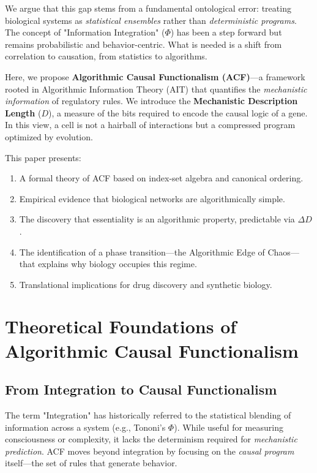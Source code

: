 \documentclass[10pt, twocolumn]{article}
\begin{document}
We argue that this gap stems from a fundamental ontological error: treating biological systems as \textit{statistical ensembles} rather than \textit{deterministic programs}. The concept of "Information Integration" ($\Phi$) has been a step forward but remains probabilistic and behavior-centric. What is needed is a shift from correlation to causation, from statistics to algorithms.

Here, we propose \textbf{Algorithmic Causal Functionalism (ACF)}—a framework rooted in Algorithmic Information Theory (AIT) that quantifies the \textit{mechanistic information} of regulatory rules. We introduce the \textbf{Mechanistic Description Length} ($D$), a measure of the bits required to encode the causal logic of a gene. In this view, a cell is not a hairball of interactions but a compressed program optimized by evolution.

This paper presents:
\begin{enumerate}
    \item A formal theory of ACF based on index-set algebra and canonical ordering.
    \item Empirical evidence that biological networks are algorithmically simple.
    \item The discovery that essentiality is an algorithmic property, predictable via $\Delta D$.
    \item The identification of a phase transition—the Algorithmic Edge of Chaos—that explains why biology occupies this regime.
    \item Translational implications for drug discovery and synthetic biology.
\end{enumerate}

\section{Theoretical Foundations of Algorithmic Causal Functionalism}

\subsection{From Integration to Causal Functionalism}

The term "Integration" has historically referred to the statistical blending of information across a system (e.g., Tononi's $\Phi$). While useful for measuring consciousness or complexity, it lacks the determinism required for \textit{mechanistic prediction}. ACF moves beyond integration by focusing on the \textit{causal program} itself—the set of rules that generate behavior.
\end{document}
